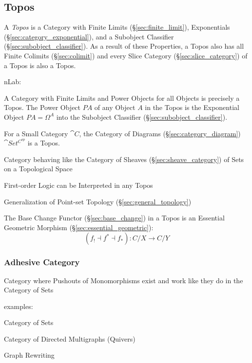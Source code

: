\subsection{Topos}\label{sec:topos}

A \emph{Topos} is a Category with Finite Limits
(\S\ref{sec:finite_limit}), Exponentials
(\S\ref{sec:category_exponential}), and a Subobject Classifier
(\S\ref{sec:subobject_classifier}). As a result of these Properties, a
Topos also has all Finite Colimits (\S\ref{sec:colimit}) and every
Slice Category (\S\ref{sec:slice_category}) of a Topos is also a
Topos.

nLab:

A Category with Finite Limits and Power Objects for all Objects is
precisely a Topos. The Power Object $P A$ of any Object $A$ in the
Topos is the Exponential Object $P A = \Omega^A$ into the Subobject
Classifier (\S\ref{sec:subobject_classifier}).

For a Small Category $\cat{C}$, the Category of Diagrams
(\S\ref{sec:category_diagram}) $\cat{Set^{C^{op}}}$ is a
Topos.\cite{awodey06}

Category behaving like the Category of Sheaves
(\S\ref{sec:sheave_category}) of Sets on a Topological Space

First-order Logic can be Interpreted in any Topos

Generalization of Point-set Topology (\S\ref{sec:general_topology})

The Base Change Functor (\S\ref{sec:base_change}) in a Topos is an
Essential Geometric Morphism (\S\ref{sec:essential_geometric}):
\[
  (f_! \dashv f^* \dashv f_*):C/X \rightarrow C/Y
\]



\subsubsection{Adhesive Category}\label{sec:adhesive_category}

Category where Pushouts of Monomorphisms exist and work like they do in the
Category of Sets

examples:

Category of Sets

Category of Directed Multigraphs (Quivers)

Graph Rewriting %



